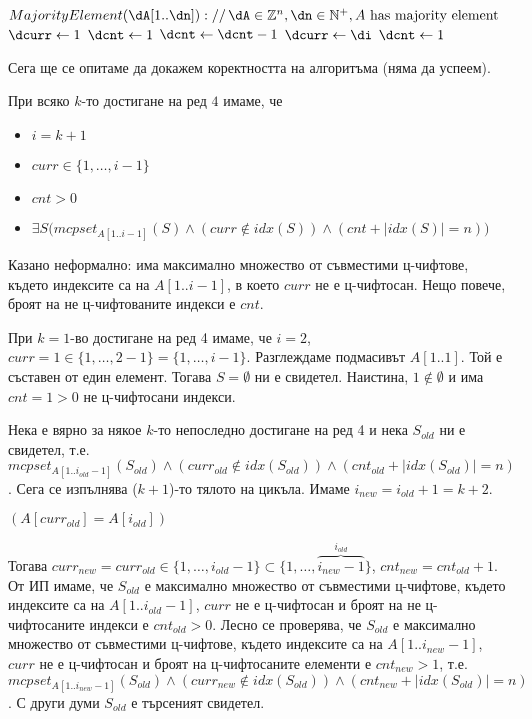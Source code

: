 \begin{solution}
\begin{pseudocode}
		$MajorityElement(\dA[1..\dn])://\,\dA\in\mathbb{Z}^n,\dn\in\mathbb{N}^+,A\text{ has majority element}$
		\Mybegin
		{	
			$\dcurr\leftarrow1$\;
			$\dcnt\leftarrow1$\;
			{
				\Else
				{
					$\dcnt\leftarrow\dcnt-1$\;
					{
						$\dcurr\leftarrow\di$\;
						$\dcnt\leftarrow1$\;
					}
				}
			}
			\KwRet{$\dA[\dcurr]$\;}
		}
	\end{pseudocode}
	Сега ще се опитаме да докажем коректността на алгоритъма (няма да успеем).
	\begin{boxinvariant*}{}{}
		При всяко $k$-то достигане на ред $4$ имаме, че
		\begin{itemize}
			\item $i=k+1$
			\item $curr\in\{1,\dots,i-1\}$
			\item $cnt>0$
			\item $\exists S\big(mcpset_{A[1..i-1]}(S)\land(curr\notin idx(S))\land(cnt+|idx(S)|=n)\big)$
		\end{itemize}
	\end{boxinvariant*}
	\begin{remark*}
		Казано неформално: има максимално множество от съвместими ц-чифтове, където индексите са на $A[1..i-1]$, в което $curr$ не е ц-чифтосан. Нещо повече, броят на не ц-чифтованите индекси е $cnt$.
	\end{remark*}
	\begin{base}
		При $k=1$-во достигане на ред 4 имаме, че $i=2$, $curr\!=\!1\!\in\!\{1,\dots,2-1\}\!=\!\{1,\dots,i-1\}$. Разглеждаме подмасивът $A[1..1]$. Той е съставен от един елемент. Тогава $S=\emptyset$ ни е свидетел. Наистина, $1\notin\emptyset$ и има $cnt=1>0$ не ц-чифтосани индекси. 
	\end{base}
	\begin{maintenance}
		Нека е вярно за някое $k$-то непоследно достигане на ред 4 и нека $S_{old}$ ни е свидетел, т.е. $mcpset_{A[1..i_{old}-1]}(S_{old})\land(curr_{old}\notin idx(S_{old}))\land(cnt_{old}+|idx(S_{old})|=n)$. Сега се изпълнява ($k+1$)-то тялото на цикъла. Имаме $i_{new}=i_{old}+1=k+2$.
		\begin{mycase}
			\item $(A[curr_{old}]=A[i_{old}])$

			\vspace{-0.35cm}
			Тогава $curr_{new}=curr_{old}\in\{1,\dots,i_{old}-1\}\subset\{1,\dots,\overbrace{i_{new}-1}^{i_{old}}\}$, $cnt_{new}=cnt_{old}+1$. От ИП имаме, че $S_{old}$ е максимално множество от съвместими ц-чифтове, където индексите са на $A[1..i_{old}-1]$, $curr$ не е ц-чифтосан и броят на не ц-чифтосаните индекси е $cnt_{old}>0$. Лесно се проверява, че $S_{old}$ е максимално множество от съвместими ц-чифтове, където индексите са на $A[1..i_{new}-1]$, $curr$ не е ц-чифтосан и броят на ц-чифтосаните елементи е $cnt_{new}>1$, т.е. $mcpset_{A[1..i_{new}-1]}(S_{old})\land(curr_{new}\notin idx(S_{old}))\land(cnt_{new}+|idx(S_{old})|=n)$. С други думи $S_{old}$ е търсеният свидетел.
			

\end{mycase}
\end{maintenance}
\end{solution}
